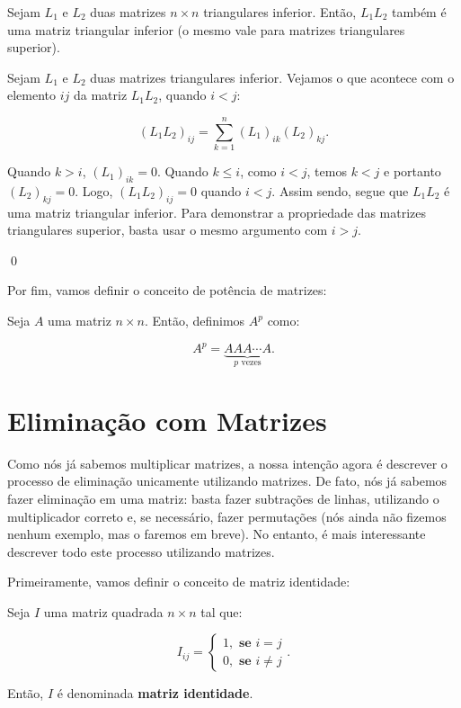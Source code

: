 \begin{Proposition}
	Sejam $L_1$ e $L_2$ duas matrizes $n\times n$ triangulares inferior. Então, $L_1L_2$ também é uma matriz triangular inferior (o mesmo vale para matrizes triangulares superior).
\end{Proposition}

\begin{Proof}
	Sejam $L_1$ e $L_2$ duas matrizes triangulares inferior. Vejamos o que acontece com o elemento $ij$ da matriz $L_1L_2$, quando $i < j$:
	
	$$
	(L_1L_2)_{ij} = \sum\limits_{k = 1}^{n} (L_1)_{ik}(L_2)_{kj}.
	$$
	
	Quando $k > i$, $(L_1)_{ik} = 0$. Quando $k \leq i$, como $i < j$, temos $k < j$ e portanto $(L_2)_{kj} = 0$. Logo, $(L_1L_2)_{ij} = 0$ quando $i < j$. Assim sendo, segue que $L_1L_2$ é uma matriz triangular inferior. Para demonstrar a propriedade das matrizes triangulares superior, basta usar o mesmo argumento com $i > j$.
	
	\qed
\end{Proof}

Por fim, vamos definir o conceito de potência de matrizes:

\begin{Definition}[Potências]
	Seja $A$ uma matriz $n\times n$. Então, definimos $A^p$ como:
	
	$$
	A^p = \underbrace{AAA\cdots A}_{p\text{ vezes}}.
	$$
\end{Definition}

\section{Eliminação com Matrizes}

Como nós já sabemos multiplicar matrizes, a nossa intenção agora é descrever o processo de eliminação unicamente utilizando matrizes. De fato, nós já sabemos fazer eliminação em uma matriz: basta fazer subtrações de linhas, utilizando o multiplicador correto e, se necessário, fazer permutações (nós ainda não fizemos nenhum exemplo, mas o faremos em breve). No entanto, é mais interessante descrever todo este processo utilizando matrizes.

Primeiramente, vamos definir o conceito de matriz identidade:

\begin{Definition}
	Seja $I$ uma matriz quadrada $n\times n$ tal que:
	
	$$
	I_{ij} = \begin{cases}
		1, \textbf{~se $i = j$} \\
		0, \textbf{~se $i\neq j$}
	\end{cases}.
	$$
	
	Então, $I$ é denominada \textbf{matriz identidade}.
\end{Definition}

